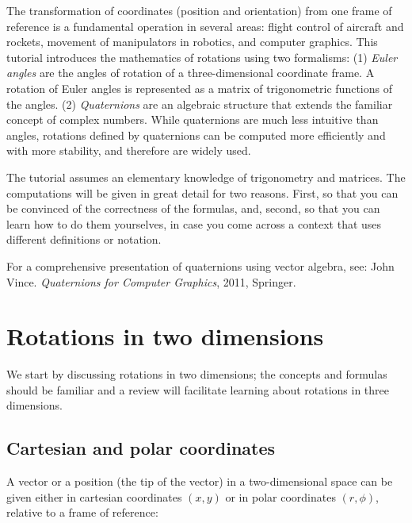 \documentclass[11pt,a4paper]{report}
\begin{document}
The transformation of coordinates (position and orientation) from one frame of reference is a fundamental operation in several areas: flight control of aircraft and rockets, movement of manipulators in robotics, and computer graphics. This tutorial introduces the mathematics of rotations using two formalisms: (1) \emph{Euler angles} are the angles of rotation of a three-dimensional coordinate frame. A rotation of Euler angles is represented as a matrix of trigonometric functions of the angles. (2) \emph{Quaternions} are an algebraic structure that extends the familiar concept of complex numbers. While quaternions are much less intuitive than angles, rotations defined by quaternions can be computed more efficiently and with more stability, and therefore are widely used.

The tutorial assumes an elementary knowledge of trigonometry and matrices. The computations will be given in great detail for two reasons. First, so that you can be convinced of the correctness of the formulas, and, second, so that you can learn how to do them yourselves, in case you come across a context that uses different definitions or notation.

For a comprehensive presentation of quaternions using vector algebra, see: John Vince. \textit{Quaternions for Computer Graphics}, 2011, Springer.



\chapter{Rotations in two dimensions}


We start by discussing rotations in two dimensions; the concepts and formulas should be familiar and a review will facilitate learning about rotations in three dimensions.

\section{Cartesian and polar coordinates}

A vector or a position (the tip of the vector) in a two-dimensional space can be given either in cartesian coordinates $(x,y)$ or in polar coordinates $(r,\phi)$, relative to a frame of reference:
\begin{center}
\end{center}
\end{document}
